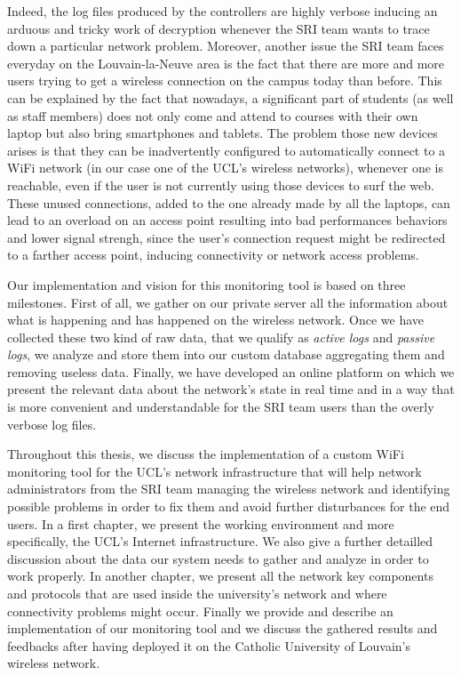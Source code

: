 Indeed, the log files produced by the controllers are highly verbose inducing an arduous and tricky work of decryption whenever the SRI team wants to trace down a particular network problem. Moreover, another issue the SRI team faces everyday on the Louvain-la-Neuve area is the fact that there are more and more users trying to get a wireless connection on the campus today than before. This can be explained by the fact that nowadays, a significant part of students (as well as staff members) does not only come and attend to courses with their own laptop but also bring smartphones and tablets. The problem those new devices arises is that they can be inadvertently configured to automatically connect to a WiFi network (in our case one of the UCL's wireless networks), whenever one is reachable, even if the user is not currently using those devices to surf the web. These unused connections, added to the one already made by all the laptops, can lead to an overload on an access point resulting into bad performances behaviors and lower signal strengh, since the user's connection request might be redirected to a farther access point, inducing connectivity or network access problems.


Our implementation and vision for this monitoring tool is based on three milestones. First of all, we gather on our private server all the information about what is happening and has happened on the wireless network. Once we have collected these two kind of raw data, that we qualify as \textit{active logs} and \textit{passive logs}, we analyze and store them into our custom database aggregating them and removing useless data. Finally, we have developed an online platform on which we present the relevant data about the network's state in real time and in a way that is more convenient and understandable for the SRI team users than the overly verbose log files.

Throughout this thesis, we discuss the implementation of a custom WiFi monitoring tool for the UCL's network infrastructure that will help network administrators from the SRI team managing the wireless network and identifying possible problems in order to fix them and avoid further disturbances for the end users. In a first chapter, we present the working environment and more specifically, the UCL's Internet infrastructure. We also give a further detailled discussion about the data our system needs to gather and analyze in order to work properly. In another chapter, we present all the network key components and protocols that are used inside the university's network and where connectivity problems might occur. Finally we provide and describe an implementation of our monitoring tool and we discuss the gathered results and feedbacks after having deployed it on the Catholic University of Louvain's wireless network.

